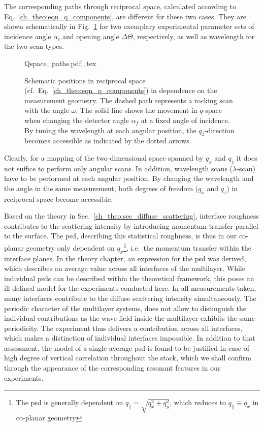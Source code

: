 The corresponding paths through reciprocal space, calculated according to Eq.~\eqref{ch_theo:eqn_q_components}, are different for these two cases. They are shown schematically in Fig.~\ref{ch_diff:fig_pathsInQ} for two exemplary experimental parameter sets of incidence angle $\alpha_i$ and opening angle $\Delta \Theta$, respectively,  as well as wavelength for the two scan types.
\begin{figure}[htbp]
    \def\svgwidth{0.7\textwidth}
    {Qspace_paths.pdf_tex}
    \caption[Schematic measurement paths in reciprocal space.]{Schematic positions in reciprocal space (cf.~Eq.~\eqref{ch_theo:eqn_q_components}) in dependence on the measurement geometry. The dashed path represents a rocking scan with the angle $\omega$. The solid line shows the movement in $q$-space when changing the detector angle $\alpha_f$ at a fixed angle of incidence. By tuning the wavelength at each angular position, the $q_z$-direction becomes accessible as indicated by the dotted arrows.}
    \label{ch_diff:fig_pathsInQ} 
\end{figure}
Clearly, for a mapping of the two-dimensional space spanned by $q_x$ and $q_z$ it does not suffice to perform only angular scans. In addition, wavelength scans ($\lambda$-scan) have to be performed at each angular position. By changing the wavelength and the angle in the same measurement, both degrees of freedom ($q_x$ and $q_z$) in reciprocal space become accessible.

Based on the theory in Sec.~\ref{ch_theo:sec_diffuse_scattering}, interface roughness contributes to the scattering intensity by introducing momentum transfer parallel to the surface. The \gls{psd}, describing this statistical roughness, is thus in our co-planar geometry only dependent on $q_x$\footnote{The \gls{psd} is generally dependent on $q_\parallel = \sqrt{q_x^2+q_y^2}$, which reduces to $q_\parallel \equiv q_x$ in co-planar geometry}, i.e.~the momentum transfer within the interface planes. In the theory chapter, an expression for the \gls{psd} was derived, which describes an average value across all interfaces of the multilayer. While individual \gls{psd}s can be described within the theoretical framework, this poses an ill-defined model for the experiments conducted here. In all measurements taken, many interfaces contribute to the diffuse scattering intensity simultaneously. The periodic character of the multilayer systems, does not allow to distinguish the individual contributions as the wave field inside the multilayer exhibits the same periodicity. The experiment thus delivers a contribution across all interfaces, which makes a distinction of individual interfaces impossible. In addition to that assessment, the model of a single average \gls{psd} is found to be justified in case of high degree of vertical correlation throughout the stack, which we shall confirm through the appearance of the corresponding resonant features in our experiments.

